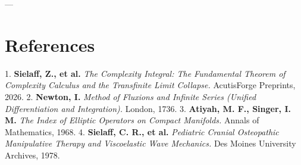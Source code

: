 \documentclass[11pt,twocolumn]{article}
\begin{document}
---

\section{References}
1. \textbf{Sielaff, Z., et al.} \textit{The Complexity Integral: The Fundamental Theorem of Complexity Calculus and the Transfinite Limit Collapse.} AcutisForge Preprints, 2026.
2. \textbf{Newton, I.} \textit{Method of Fluxions and Infinite Series (Unified Differentiation and Integration).} London, 1736.
3. \textbf{Atiyah, M. F., Singer, I. M.} \textit{The Index of Elliptic Operators on Compact Manifolds.} Annals of Mathematics, 1968.
4. \textbf{Sielaff, C. R., et al.} \textit{Pediatric Cranial Osteopathic Manipulative Therapy and Viscoelastic Wave Mechanics.} Des Moines University Archives, 1978.
\end{document}
